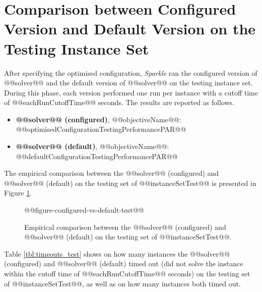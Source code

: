 \documentclass[british]{article}
\newif\iftest
\newif\ifruntime
\begin{document}

\iftest
    \section{Comparison between Configured Version and Default Version on the Testing Instance Set}

    After specifying the optimised configuration, \emph{Sparkle} ran the configured version of @@solver@@ and the default version of @@solver@@ on the testing instance set. During this phase, each version performed one run per instance with a cutoff time of @@eachRunCutoffTime@@ seconds. The results are reported as follows.

    \begin{itemize}
        \item \textbf{@@solver@@ (configured)}, @@objectiveName@@: @@optimisedConfigurationTestingPerformancePAR@@
        \item \textbf{@@solver@@ (default)}, @@objectiveName@@: @@defaultConfigurationTestingPerformancePAR@@
    \end{itemize}

    The empirical comparison between the @@solver@@ (configured) and @@solver@@ (default) on the testing set of @@instanceSetTest@@ is presented in Figure \ref{fig:configured_vs_default_test}.

    \begin{figure}[htbp]
        \noindent
        \begin{centering}
            @@figure-configured-vs-default-test@@
            \par
        \end{centering}

       \caption{Empirical comparison between the @@solver@@ (configured) and @@solver@@ (default) on the testing set of @@instanceSetTest@@.}\label{fig:configured_vs_default_test}
    \end{figure}


        Table \ref{tbl:timeouts_test} shows on how many instances the @@solver@@ (configured) and @@solver@@ (default) timed out (did not solve the instance within the cutoff time of @@eachRunCutoffTime@@ seconds) on the testing set of @@instanceSetTest@@, as well as on how many instances both timed out.
\end{document}

